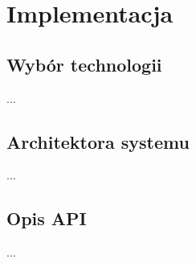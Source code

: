 \chapter{Implementacja}

\section{Wybór technologii}
...

\section{Architektora systemu}
...

\section{Opis API}
...